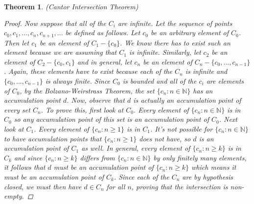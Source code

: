 \documentclass[11pt,a4paper]{report}
\theoremstyle{plain}
\newtheorem{thm}{Theorem}[section]
\theoremstyle{definition}
\theoremstyle{remark}
\begin{document}
\begin{thm}{(Cantor Intersection Theorem)}
\begin{proof}
Now suppose that all of the $C_i$ are infinite. Let the sequence of points $c_0, c_1, ..., c_n, c_{n+1}, ...$ be defined as follows.  Let $c_0$ be an arbitrary element of $C_0$.  Then let $c_1$ be an element of $C_1 - \{c_0\}$.  We know there has to exist such an element because we are assuming that $C_1$ is infinite.  Similarly, let $c_2$ be an element of $C_2 - \{c_0, c_1\}$ and in general, let $c_n$ be an element of $C_n - \{c_0, ... , c_{n-1}\}$.  Again, these elements have to exist because each of the $C_n$ is infinite and $\{c_0, ... , c_{n-1}\}$ is always finite. Since $C_0$ is bounded and all of the $c_i$ are elements of $C_0$, by the Bolzano-Weirstrass Theorem, the set $\{c_n \colon n \in \mathbb{N} \}$ has an accumulation point $d$. Now, observe that $d$ is actually an accumulation point of \textit{every} set $C_n$.  To prove this, first look at $C_0$. Every element of $\{c_n \colon n \in \mathbb{N} \}$ is in $C_0$ so any accumulation point of this set is an accumulation point of $C_0$.  Next look at $C_1$. Every element of $\{c_n \colon n \geq 1 \}$ is in $C_1$.  It's not possible for $\{c_n \colon n \in \mathbb{N} \}$ to have accumulation points that $\{c_n \colon n \geq 1 \}$ does not have, so $d$ is an accumulation point of $C_1$ as well.  In general, every element of $\{c_n \colon n \geq k \}$ is in $C_k$ and since $\{c_n \colon n \geq k \}$ differs from $\{c_n \colon n \in \mathbb{N} \}$ by only finitely many elements, it follows that $d$ must be an accumulation point of $\{c_n \colon n \geq k  \}$ which means it must be an accumulation point of $C_k$. Since each of the $C_n$ are by hypothesis closed, we must then have $d \in C_n$ for all $n$, proving that the intersection is non-empty.
\end{proof}
\end{thm}
\end{document}

